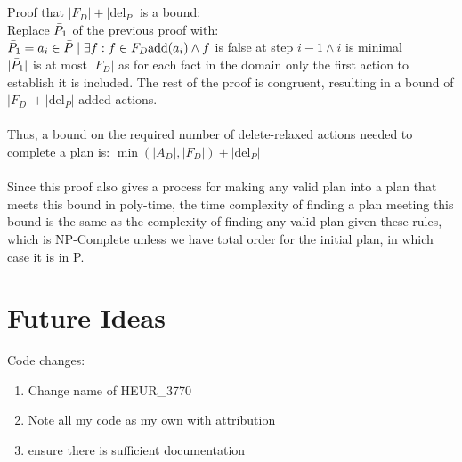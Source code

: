 \documentclass[runningheads]{llncs}
\begin{document}
\\\\
Proof that $|F_D|+ |\text{del}_P|$ is a bound:\\
Replace $\Bar{P}_1$ of the previous proof with:\\
$\Bar{P}_1=a_i\in\Bar{P}\mid \exists f: f\in F_D \text{add}(a_i)\wedge f$ is false at step $i-1 \wedge i$ is minimal\\
$|\Bar{P}_1|$ is at most $|F_D|$ as for each fact in the domain only the first action to establish it is included. The rest of the proof is congruent, resulting in a bound of $|F_D|+ |\text{del}_P|$ added actions.\\\\
Thus, a bound on the required number of delete-relaxed actions needed to complete a plan is: $\min (|A_D|,|F_D|)+ |\text{del}_P|$
\\\\
Since this proof also gives a process for making any valid plan into a plan that meets this bound in poly-time, the time complexity of finding a plan meeting this bound is the same as the complexity of finding any valid plan given these rules, which is NP-Complete unless we have total order for the initial plan, in which case it is in P.~\cite{Bercher2021POCLComplexities} 

\section{Future Ideas}
Code changes:
\begin{enumerate}
    \item Change name of HEUR\_3770
    \item Note all my code as my own with attribution
    \item ensure there is sufficient documentation
\end{enumerate}
\end{document}
